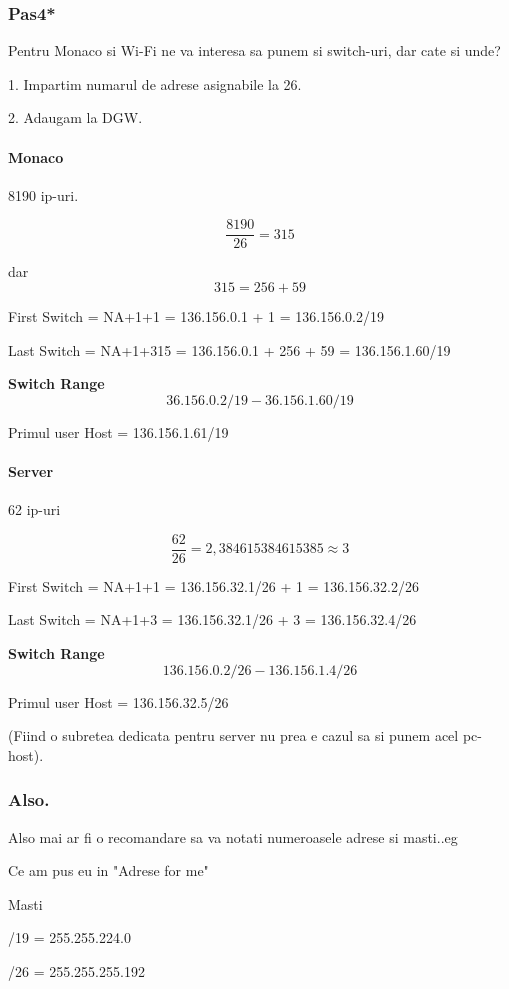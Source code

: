 \documentclass{article}
\begin{document}
\subsubsection{Pas4*}

Pentru Monaco si Wi-Fi ne va interesa sa punem si switch-uri, dar cate si unde?

1. Impartim numarul de adrese asignabile la 26.

2. Adaugam la DGW.


\paragraph{Monaco} 8190 ip-uri.

\[\frac{8190}{26} = 315\]

dar \[315 = 256 + 59\]

First Switch = NA+1+1 = 136.156.0.1 + 1 = 136.156.0.2/19

Last Switch = NA+1+315 = 136.156.0.1 + 256 + 59 = 136.156.1.60/19



\textbf{Switch Range} 
\[36.156.0.2/19 - 36.156.1.60/19\]

Primul user Host = 136.156.1.61/19

\paragraph{Server} 62 ip-uri

\[ \frac{62}{26}=2,384615384615385 \approx3\]

First Switch = NA+1+1 = 136.156.32.1/26 + 1 = 136.156.32.2/26

Last Switch = NA+1+3 = 136.156.32.1/26 + 3 = 136.156.32.4/26


\textbf{Switch Range} 
\[136.156.0.2/26 - 136.156.1.4/26\]


Primul user Host = 136.156.32.5/26

(Fiind o subretea dedicata pentru server nu prea e cazul sa si punem acel pc-host).

\subsubsection{Also.}
Also mai ar fi o recomandare sa va notati numeroasele adrese si masti..eg

Ce am pus eu in "Adrese for me"

Masti


/19 = 255.255.224.0

/26 = 255.255.255.192
\end{document}
